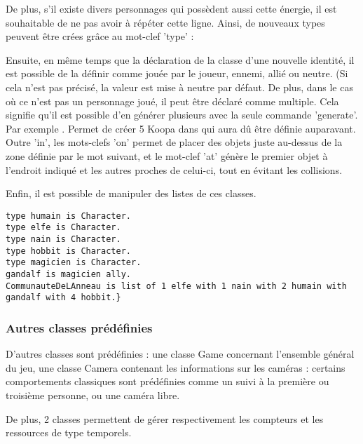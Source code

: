 De plus, s'il existe divers personnages qui possèdent aussi cette énergie, il est souhaitable de ne pas avoir à répéter cette ligne.
Ainsi, de nouveaux types peuvent être crées grâce au mot-clef 'type' :

Ensuite, en même temps que la déclaration de la classe d'une nouvelle identité, il est possible de la définir comme jouée par le joueur, ennemi, allié ou neutre.
(Si cela n'est pas précisé, la valeur est mise à neutre par défaut.
De plus, dans le cas où ce n'est pas un personnage joué, il peut être déclaré comme multiple.
Cela signifie qu'il est possible d'en générer plusieurs avec la seule commande 'generate'.
Par exemple  . Permet de créer 5 Koopa dans  qui aura dû être définie
auparavant. Outre 'in', les mots-clefs 'on' permet de placer des objets juste au-dessus de la zone définie par le mot suivant, et le mot-clef 'at' génère
le premier objet à l'endroit indiqué et les autres proches de celui-ci, tout en évitant les collisions.

Enfin, il est possible de manipuler des listes de ces classes.
\begin{lstlisting}[language=GameGrammar]
type humain is Character. 
type elfe is Character. 
type nain is Character. 
type hobbit is Character. 
type magicien is Character. 
gandalf is magicien ally.
CommunauteDeLAnneau is list of 1 elfe with 1 nain with 2 humain with gandalf with 4 hobbit.}
\end{lstlisting}

\subsubsection{Autres classes prédéfinies}

D'autres classes sont prédéfinies : une classe Game concernant l'ensemble général du jeu, une classe Camera contenant les informations sur les caméras :
certains comportements classiques sont prédéfinies comme un suivi à la première ou troisième personne, ou une caméra libre.

De plus, 2 classes permettent de gérer respectivement les compteurs et les ressources de type temporels.

